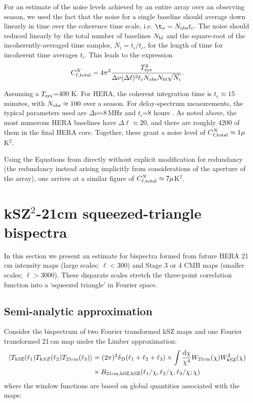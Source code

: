 For an estimate of the noise levels achieved by an entire array over an observing season, we used the fact that the noise for a single baseline should average down linearly in time over the coherence time scale, i.e. $\t_{\nu} = N_{\rm obs}t_c$. The noise should reduced linearly by the total number of baselines $N_{\rm bl}$ and the square-root of the incoherently-averaged time samples, $N_i = t_i/t_c$, for the length of time for incoherent time averages $t_i$. This leads to the expression
\begin{equation}
C^N_{\ell,{\rm total}} = 4\pi^2\frac{T_{\rm sys}^2}{\Delta\nu(\Delta\ell)^2 t_c N_{\rm obs} N_{\rm bl}\sqrt{N_i}}.
\end{equation}

Assuming a $T_{\rm sys}$=400 K. For HERA, the coherent integration time is $t_c\approx 15$\,minutes, with $N_{\rm obs}\approx100$ over a season. For delay-spectrum measurements, the typical parameters used are $\Delta\nu$=8\,MHz and $t_i$=8 hours \citep{Ali.15}. As noted above, the most numerous HERA baselines have $\Delta\ell\approx 20$, and there are roughly 4200 of them in the final HERA core. Together, these grant a noise level of $C^N_{\ell,{\rm total}}\approx 1 \mu$K$^2$.

Using the Equations from \cite{Zaldarriaga.04} directly without explicit modification for redundancy (the redundancy instead arising implicitly from considerations of the aperture of the array), one arrives at a similar figure of $C^N_{\ell,{\rm total}}\approx 7 \mu$K$^2$.


\section{kSZ$^2$-21cm squeezed-triangle bispectra}
\label{sec:bispec}

In this section we present an estimate for bispectra formed from future HERA 21\,cm intensity maps (large scales; $\ell < 300$) and Stage 3 or 4 CMB maps (smaller scales; $\ell > 3000$). These disparate scales stretch the three-point correlation function into a `squeezed triangle' in Fourier space.

\subsection{Semi-analytic approximation}

Consider the bispectrum of two Fourier transformed kSZ maps and one Fourier transformed 21\,cm map under the Limber approximation:
\begin{equation}
\begin{split}
 \left\langle T_{\rm kSZ}(\ell_1) T_{kSZ}(\ell_2) T_{\rm 21cm}(\ell_3)\right\rangle &= 
(2\pi)^2 \delta_D(\ell_1 + \ell_2 + \ell_3) \times \int
 \frac{{\rm d}\chi}{\chi^4} W_{\rm 21cm}(\chi) W_{\rm kSZ}^2(\chi)  \\
 & \times B_{\rm 21cm, kSZ, kSZ}(\ell_1/\chi, \ell_2/\chi,  \ell_3/\chi; \chi)
\label{eq:bispec_limber}
\end{split}
\end{equation}
where the window functions are based on global quantities associated with the maps:

